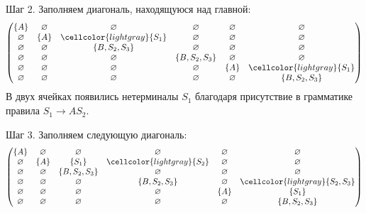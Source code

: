 \begin{example}
    Шаг 2.
    Заполняем диагональ, находящуюся над главной:
    \[
        \begin{pmatrix}
            \{A\}       & \varnothing & \varnothing                  & \varnothing     & \varnothing & \varnothing                  \\
            \varnothing & \{A\}       & \cellcolor{lightgray}\{S_1\} & \varnothing     & \varnothing & \varnothing                  \\
            \varnothing & \varnothing & \{B, S_2, S_3\}              & \varnothing     & \varnothing & \varnothing                  \\
            \varnothing & \varnothing & \varnothing                  & \{B, S_2, S_3\} & \varnothing & \varnothing                  \\
            \varnothing & \varnothing & \varnothing                  & \varnothing     & \{A\}       & \cellcolor{lightgray}\{S_1\} \\
            \varnothing & \varnothing & \varnothing                  & \varnothing     & \varnothing & \{B, S_2, S_3\}
        \end{pmatrix}
    \]
    В двух ячейках появились нетерминалы $S_1$ благодаря присутствие в грамматике правила $S_1 \to A S_2$.

    Шаг 3.
    Заполняем следующую диагональ:
    \[
        \begin{pmatrix}
            \{A\}       & \varnothing & \varnothing     & \varnothing                  & \varnothing & \varnothing                       \\
            \varnothing & \{A\}       & \{S_1\}         & \cellcolor{lightgray}\{S_2\} & \varnothing & \varnothing                       \\
            \varnothing & \varnothing & \{B, S_2, S_3\} & \varnothing                  & \varnothing & \varnothing                       \\
            \varnothing & \varnothing & \varnothing     & \{B, S_2, S_3\}              & \varnothing & \cellcolor{lightgray}\{S_2, S_3\} \\
            \varnothing & \varnothing & \varnothing     & \varnothing                  & \{A\}       & \{S_1\}                           \\
            \varnothing & \varnothing & \varnothing     & \varnothing                  & \varnothing & \{B, S_2, S_3\}
        \end{pmatrix}
    \]


\end{example}
